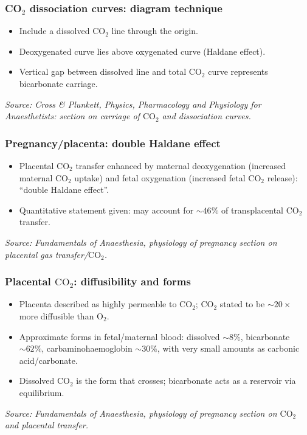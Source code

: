 \documentclass[11pt,a4paper]{article}
\begin{document}
\subsubsection{CO\(_2\) dissociation curves: diagram technique}
\begin{itemize}
  \item Include a dissolved \(\mathrm{CO_2}\) line through the origin.
  \item Deoxygenated curve lies above oxygenated curve (Haldane effect).
  \item Vertical gap between dissolved line and total \(\mathrm{CO_2}\) curve represents bicarbonate carriage.
\end{itemize}
\textit{Source: Cross \& Plunkett, Physics, Pharmacology and Physiology for Anaesthetists: section on carriage of \(\mathrm{CO_2}\) and dissociation curves.}

\subsubsection{Pregnancy/placenta: double Haldane effect}
\begin{itemize}
  \item Placental \(\mathrm{CO_2}\) transfer enhanced by maternal deoxygenation (increased maternal \(\mathrm{CO_2}\) uptake) and fetal oxygenation (increased fetal \(\mathrm{CO_2}\) release): ``double Haldane effect''.
  \item Quantitative statement given: may account for \(\sim 46\%\) of transplacental \(\mathrm{CO_2}\) transfer.
\end{itemize}
\textit{Source: Fundamentals of Anaesthesia, physiology of pregnancy section on placental gas transfer/\(\mathrm{CO_2}\).}

\subsubsection{Placental \(\mathrm{CO_2}\): diffusibility and forms}
\begin{itemize}
  \item Placenta described as highly permeable to \(\mathrm{CO_2}\); \(\mathrm{CO_2}\) stated to be \(\sim 20\times\) more diffusible than \(\mathrm{O_2}\).
  \item Approximate forms in fetal/maternal blood: dissolved \(\sim 8\%\), bicarbonate \(\sim 62\%\), carbaminohaemoglobin \(\sim 30\%\), with very small amounts as carbonic acid/carbonate.
  \item Dissolved \(\mathrm{CO_2}\) is the form that crosses; bicarbonate acts as a reservoir via equilibrium.
\end{itemize}
\textit{Source: Fundamentals of Anaesthesia, physiology of pregnancy section on \(\mathrm{CO_2}\) and placental transfer.}
\end{document}
